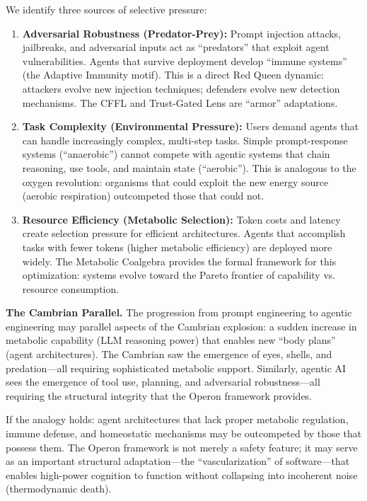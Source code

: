 We identify three sources of selective pressure:
\begin{enumerate}[leftmargin=*]
\item \textbf{Adversarial Robustness (Predator-Prey):} Prompt injection attacks, jailbreaks, and adversarial
inputs act as ``predators'' that exploit agent vulnerabilities. Agents that survive deployment develop
``immune systems'' (the Adaptive Immunity motif). This is a direct Red Queen dynamic: attackers evolve new
injection techniques; defenders evolve new detection mechanisms. The CFFL and Trust-Gated Lens are
``armor'' adaptations.

\item \textbf{Task Complexity (Environmental Pressure):} Users demand agents that can handle increasingly
complex, multi-step tasks. Simple prompt-response systems (``anaerobic'') cannot compete with agentic
systems that chain reasoning, use tools, and maintain state (``aerobic''). This is analogous to the
oxygen revolution: organisms that could exploit the new energy source (aerobic respiration) outcompeted
those that could not.

\item \textbf{Resource Efficiency (Metabolic Selection):} Token costs and latency create selection pressure
for efficient architectures. Agents that accomplish tasks with fewer tokens (higher metabolic efficiency)
are deployed more widely. The Metabolic Coalgebra provides the formal framework for this optimization:
systems evolve toward the Pareto frontier of capability vs. resource consumption.
\end{enumerate}

\textbf{The Cambrian Parallel.} The progression from prompt engineering to agentic engineering may parallel aspects of the
Cambrian explosion: a sudden increase in metabolic capability (LLM reasoning power) that enables new
``body plans'' (agent architectures). The Cambrian saw the emergence of eyes, shells, and predation---all
requiring sophisticated metabolic support. Similarly, agentic AI sees the emergence of tool use, planning,
and adversarial robustness---all requiring the structural integrity that the Operon framework provides.

If the analogy holds: agent architectures that lack proper metabolic regulation, immune defense, and
homeostatic mechanisms may be outcompeted by those that possess them. The Operon framework is not merely
a safety feature; it may serve as an important structural adaptation---the ``vascularization'' of software---that
enables high-power cognition to function without collapsing into incoherent noise (thermodynamic death).

